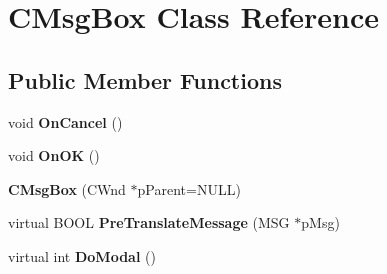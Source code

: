 \hypertarget{class_c_msg_box}{\section{C\-Msg\-Box Class Reference}
\label{class_c_msg_box}
}
\subsection*{Public Member Functions}
\begin{DoxyCompactItemize}
\item 
\hypertarget{class_c_msg_box_a4e97ebfff40a62a868aa237c842e3646}{void {\bfseries On\-Cancel} ()}\label{class_c_msg_box_a4e97ebfff40a62a868aa237c842e3646}

\item 
\hypertarget{class_c_msg_box_a50079a491415930d4813ff4c70e1928c}{void {\bfseries On\-O\-K} ()}\label{class_c_msg_box_a50079a491415930d4813ff4c70e1928c}

\item 
\hypertarget{class_c_msg_box_a1131cf33bdd803b6d242f385844c5697}{{\bfseries C\-Msg\-Box} (C\-Wnd $\ast$p\-Parent=N\-U\-L\-L)}\label{class_c_msg_box_a1131cf33bdd803b6d242f385844c5697}

\item 
\hypertarget{class_c_msg_box_a35d1fbdaaccac59eb9bf0b24d9d0d18f}{virtual B\-O\-O\-L {\bfseries Pre\-Translate\-Message} (M\-S\-G $\ast$p\-Msg)}\label{class_c_msg_box_a35d1fbdaaccac59eb9bf0b24d9d0d18f}

\item 
\hypertarget{class_c_msg_box_a18d9945d73ce8f066241ae6ba8c61fd4}{virtual int {\bfseries Do\-Modal} ()}\label{class_c_msg_box_a18d9945d73ce8f066241ae6ba8c61fd4}

\end{DoxyCompactItemize}

